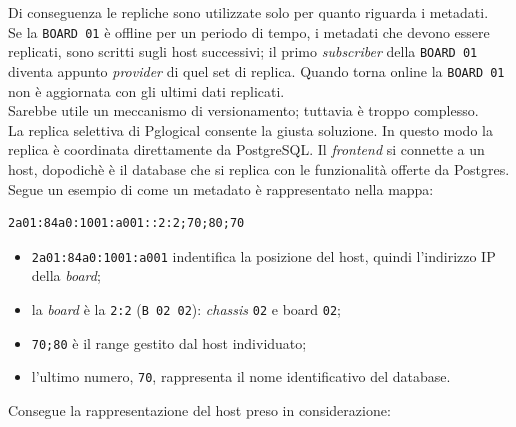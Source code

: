 Di conseguenza le repliche sono utilizzate solo per quanto riguarda i metadati. \\
Se la \verb"BOARD 01" \`{e} offline per un periodo di tempo, i metadati che devono essere replicati, sono scritti sugli host successivi; il primo \textit{subscriber} della \verb"BOARD 01" diventa appunto \textit{provider} di quel set di replica. Quando torna online la \verb"BOARD 01" non \`{e} aggiornata con gli ultimi dati replicati.\\
Sarebbe utile un meccanismo di versionamento; tuttavia \`{e} troppo complesso. \\
La replica selettiva di Pglogical consente la giusta soluzione. In questo modo la replica \`{e} coordinata direttamente da PostgreSQL. Il \textit{frontend} si connette a un host, dopodich\`{e} \`{e} il database che si replica con le funzionalit\`{a} offerte da Postgres.\\
Segue un esempio di come un metadato \`{e} rappresentato nella mappa:
\begin{verbatim}
2a01:84a0:1001:a001::2:2;70;80;70
\end{verbatim}

\begin{itemize}
\item 
\verb"2a01:84a0:1001:a001" indentifica la posizione del host, quindi l'indirizzo IP della \textit{board};
\item 
la \textit{board} \`{e} la \verb"2:2" (\verb"B 02 02"): \textit{chassis} \verb"02" e board \verb"02";
\item
\verb"70;80" \`{e} il range gestito dal host individuato;
\item
l'ultimo numero, \verb"70", rappresenta il nome identificativo del database.
\end{itemize}

Consegue la rappresentazione del host preso in considerazione:


